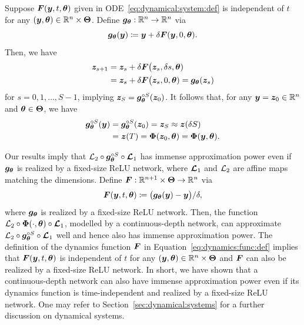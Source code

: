 \documentclass[nohyperref]{article}
\theoremstyle{plain}
\theoremstyle{definition}
\theoremstyle{remark}
\begin{document}
Suppose ${\bm{F}}({\bm{y}},t,{\bm{\theta}})$ given in ODE~\eqref{eq:dynamical:system:def} is independent of $t$ for any  $(\bmy,\bmtheta)\in\R^n\times \bmTheta$.
Define $\bmg_\bmtheta:\R^n\to\R^n$ via 
\begin{equation*}
    {\bm{g}}_{\bm{\theta}}({\bm{y}})\coloneqq {\bm{y}}+ \delta {\bm{F}}({\bm{y}},0,{\bm{\theta}}).
\end{equation*}
 Then, we have
\begin{equation*}
    \begin{split}
            {\bm{z}}_{s+1}&=
{\bm{z}}_s+\delta{\bm{F}}\big({\bm{z}}_s,\delta  s,{\bm{\theta}})\\
&={\bm{z}}_s+\delta{\bm{F}}\big({\bm{z}}_s,0,{\bm{\theta}})={\bm{g}}_{\bm{\theta}}({\bm{z}}_s)
    \end{split}
\end{equation*}
for $s=0,1,\dotsc,S-1$, implying ${\bm{z}}_S={\bm{g}}_{\bm{\theta}}^{\circ S}({\bm{z}}_0)$.
It follows that, for any $\bmy=\bmz_0\in\R^n$ and ${\bm{\theta}}\in{\bm{\Theta}}$, we have
\begin{equation*}
    \begin{split}
        {\bm{g}}_{\bm{\theta}}^{\circ S}({\bm{y}})
        &={\bm{g}}_{\bm{\theta}}^{\circ S}({\bm{z}}_0)
        ={\bm{z}}_S\approx 
        {\bm{z}}(\delta  S) \\&={\bm{z}}(T)={\bm{\Phi}}({\bm{z}}_0,{\bm{\theta}})={\bm{\Phi}}({\bm{y}},{\bm{\theta}}).
    \end{split}
\end{equation*}

Our results imply that ${\mathcal{L}}_2\circ {\bm{g}}_{\bm{\theta}}^{\circ S}\circ {\bm{\mathcal{L}}}_1$ has immense approximation power even if ${\bm{g}}_{\bm{\theta}}$ is realized by a fixed-size ReLU network, where ${\bm{\mathcal{L}}}_1$  and ${\mathcal{L}}_2$ are affine maps matching the dimensions.
Define $\bmF:\R^{n+1}\times \bmTheta\to\R^n$ via
    \begin{equation}
    \label{eq:dynamics:func:def}{\bm{F}}({\bm{y}},t,{\bm{\theta}})\coloneqq\big({\bm{g}}_{\bm{\theta}}({\bm{y}})-{\bm{y}}\big)/\delta,
\end{equation}
where ${\bm{g}}_{\bm{\theta}}$ is realized by a fixed-size ReLU network.
Then, the function ${\mathcal{L}}_2\circ {\bm{\Phi}}(\cdot,{\bm{\theta}})\circ {\bm{\mathcal{L}}}_1$, modelled by a continuous-depth network, can approximate ${\mathcal{L}}_2\circ {\bm{g}}_{\bm{\theta}}^{\circ S}\circ {\bm{\mathcal{L}}}_1$ well and hence also has immense approximation power. The definition of the dynamics function ${\bm{F}}$ in Equation~\eqref{eq:dynamics:func:def} implies that ${\bm{F}}({\bm{y}},t,{\bm{\theta}})$ is independent of $t$ for any $(\bmy,\bmtheta)\in \R^n\times \bmTheta$ and ${\bm{F}}$ can also be realized by a fixed-size ReLU network. In short, we have shown that
a continuous-depth network can also have immense approximation power even if its dynamics function is time-independent and realized by a fixed-size ReLU network.
One may refer to Section~\ref{sec:dynamical:systems} for a further discussion on dynamical systems.
\end{document}
